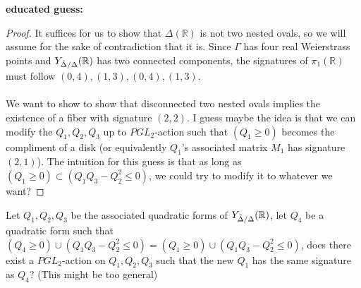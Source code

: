 \documentclass{article}
\newcommand{\Rbb}{\mathbb{R}}
\begin{document}
{\bf educated guess:}
\begin{proof}
It suffices for us to show that $\Delta(\Rbb)$ is not two nested ovals, so we will assume for the sake of contradiction that it is. Since $\Gamma$ has four real Weierstrass points and $Y_{\Tilde{\Delta}/\Delta}(\Rbb)$ has two connected components, the signatures of $\pi_1(\Rbb)$ must follow $(0, 4), (1, 3), (0, 4), (1, 3)$.\\\\
We want to show to show that disconnected two nested ovals implies the existence of a fiber with signature $(2, 2)$. I guess maybe the idea is that we can modify the $Q_1, Q_2, Q_3$ up to $PGL_2$-action such that $(Q_1 \geq 0)$ becomes the compliment of a disk (or equivalently $Q_1$'s associated matrix $M_1$ has signature $(2, 1)$). The intuition for this guess is that as long as $(Q_1 \geq 0) \subset (Q_1 Q_3 - Q_2^2 \leq 0)$, we could try to modify it to whatever we want?
\end{proof}

\begin{question}
Let $Q_1, Q_2, Q_3$ be the associated quadratic forms of $Y_{\Tilde{\Delta}/\Delta}(\Rbb)$, let $Q_4$ be a quadratic form such that $(Q_4 \geq 0) \cup (Q_1 Q_3 - Q_2^2 \leq 0) = (Q_1 \geq 0) \cup (Q_1 Q_3 - Q_2^2 \leq 0)$, does there exist a $PGL_2$-action on $Q_1, Q_2, Q_3$ such that the new $Q_1$ has the same signature as $Q_4$? (This might be too general)
\end{question}
\end{document}
